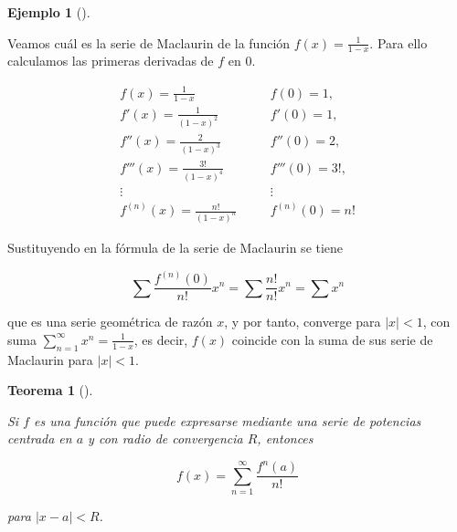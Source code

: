 \documentclass[
  a4paper,
]{scrreport}
\theoremstyle{plain}
\theoremstyle{plain}
\theoremstyle{definition}
\theoremstyle{definition}
\newtheorem{example}{Ejemplo}[chapter]
\theoremstyle{plain}
\newtheorem{theorem}{Teorema}[chapter]
\theoremstyle{remark}
\begin{document}
\leavevmode{}%
\begin{example}[]\label{exm-serie-taylor}

Veamos cuál es la serie de Maclaurin de la función
\(f(x)=\frac{1}{1-x}\). Para ello calculamos las primeras derivadas de
\(f\) en \(0\).

\[
\begin{array}{lll}
f(x)=\frac{1}{1-x} & \quad & f(0)= 1,\\
f'(x)=\frac{1}{(1-x)^2} & & f'(0)=1,\\
f''(x)=\frac{2}{(1-x)^3} & & f''(0)=2,\\
f'''(x)=\frac{3!}{(1-x)^4} & & f'''(0)=3!,\\
\vdots & & \vdots\\
f^{(n)}(x) = \frac{n!}{(1-x)^n} & & f^{(n)}(0) = n!
\end{array}
\]

Sustituyendo en la fórmula de la serie de Maclaurin se tiene

\[
\sum \frac{f^{(n)}(0)}{n!}x^n = \sum \frac{n!}{n!}x^n = \sum x^n
\]

que es una serie geométrica de razón \(x\), y por tanto, converge para
\(|x|<1\), con suma \(\sum_{n=1}^\infty x^n =\frac{1}{1-x}\), es decir,
\(f(x)\) coincide con la suma de sus serie de Maclaurin para \(|x|<1\).

\end{example}

\leavevmode{}%
\begin{theorem}[]\label{thm-serie-taylor}

Si \(f\) es una función que puede expresarse mediante una serie de
potencias centrada en \(a\) y con radio de convergencia \(R\), entonces

\[
f(x)=\sum_{n=1}^\infty \frac{f^{n}(a)}{n!}
\]

para \(|x-a|<R\).

\end{theorem}
\end{document}
